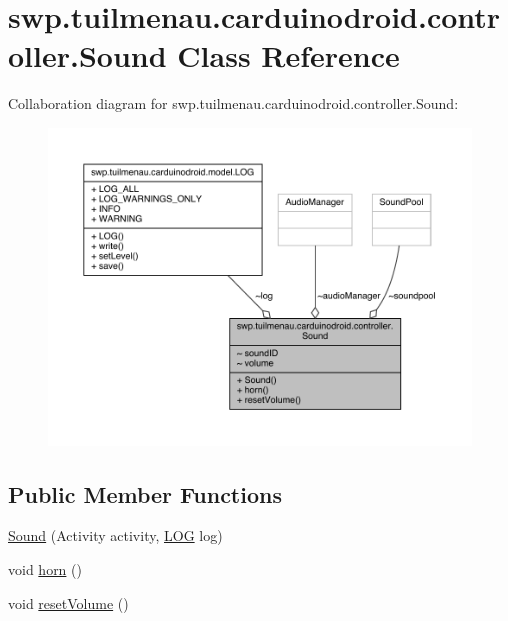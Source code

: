 \hypertarget{classswp_1_1tuilmenau_1_1carduinodroid_1_1controller_1_1_sound}{}\section{swp.\+tuilmenau.\+carduinodroid.\+controller.\+Sound Class Reference}
\label{classswp_1_1tuilmenau_1_1carduinodroid_1_1controller_1_1_sound}


Collaboration diagram for swp.\+tuilmenau.\+carduinodroid.\+controller.\+Sound\+:
\nopagebreak
\begin{figure}[H]
\begin{center}
\leavevmode
\includegraphics[width=350pt]{classswp_1_1tuilmenau_1_1carduinodroid_1_1controller_1_1_sound__coll__graph}
\end{center}
\end{figure}
\subsection*{Public Member Functions}
\begin{DoxyCompactItemize}
\item 
\hyperlink{classswp_1_1tuilmenau_1_1carduinodroid_1_1controller_1_1_sound_af59c1d12a6817625355f7803151e6e4b}{Sound} (Activity activity, \hyperlink{classswp_1_1tuilmenau_1_1carduinodroid_1_1model_1_1_l_o_g}{L\+O\+G} log)
\item 
void \hyperlink{classswp_1_1tuilmenau_1_1carduinodroid_1_1controller_1_1_sound_a065dfc4b7f9c45028ca6a16244a84e9b}{horn} ()
\item 
void \hyperlink{classswp_1_1tuilmenau_1_1carduinodroid_1_1controller_1_1_sound_ab29ad1d78fcd84ec47e6452d91bb3758}{reset\+Volume} ()
\end{DoxyCompactItemize}



